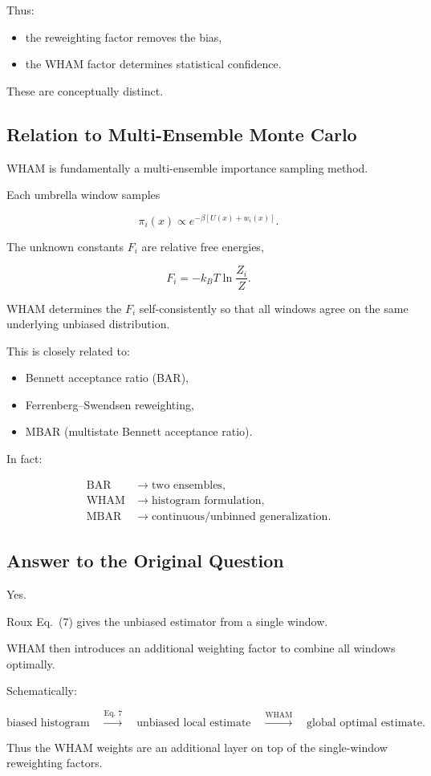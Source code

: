 Thus:

\begin{itemize}
    \item the reweighting factor removes the bias,
    \item the WHAM factor determines statistical confidence.
\end{itemize}

These are conceptually distinct.

\subsection{Relation to Multi-Ensemble Monte Carlo}

WHAM is fundamentally a multi-ensemble importance sampling method.

Each umbrella window samples

\[
\pi_i(x)
\propto
e^{-\beta[U(x)+w_i(x)]}.
\]

The unknown constants \(F_i\) are relative free energies,

\[
F_i
=
-k_B T \ln \frac{Z_i}{Z}.
\]

WHAM determines the \(F_i\) self-consistently so that all windows agree on the same underlying unbiased distribution.

This is closely related to:

\begin{itemize}
    \item Bennett acceptance ratio (BAR),
    \item Ferrenberg--Swendsen reweighting,
    \item MBAR (multistate Bennett acceptance ratio).
\end{itemize}

In fact:

\[
\begin{aligned}
\text{BAR} &\rightarrow \text{two ensembles}, \\
\text{WHAM} &\rightarrow \text{histogram formulation}, \\
\text{MBAR} &\rightarrow \text{continuous/unbinned generalization}.
\end{aligned}
\]

\subsection{Answer to the Original Question}

Yes.

Roux Eq.~(7) gives the unbiased estimator from a single window.

WHAM then introduces an additional weighting factor to combine all windows optimally.

Schematically:

\[
\text{biased histogram}
\quad
\overset{\text{Eq.~7}}{\longrightarrow}
\quad
\text{unbiased local estimate}
\quad
\overset{\text{WHAM}}{\longrightarrow}
\quad
\text{global optimal estimate}.
\]

Thus the WHAM weights are an additional layer on top of the single-window reweighting factors.
